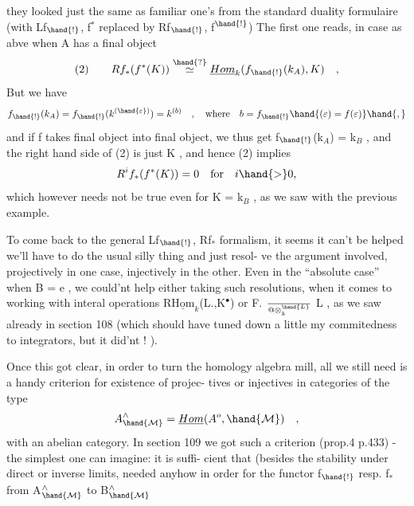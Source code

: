 
they looked just the same as familiar  one's from the standard
duality formulaire (with Lf$_{\hand{!}}$, f$^*$ replaced by Rf$_{\hand{!}}$, f$^{\hand{!}}$) The first
one reads, in case as abve when A has a final object \hand{$\varepsilon$}
\[ \text{(2)} \qquad Rf_*(f^*(K)) \overset{\hand{?}}{\simeq} \underline{Hom}_k(f_{\hand{!}}(k_A),K) \quad , \]
\deleted{\[ Rf_*(f^*(K)) \quad f_*(f^*(K)) \quad \text{i.e.} \quad R^if_*(f^*(K))= 0 \text{ for } i \ 0 \]}
But we have
\[ f_{\hand{!}}(k_A) = f_{\hand{!}}(k^{(\hand{\varepsilon})}) = k^{(b)} \quad , \quad \text{where} \quad b = f_{\hand{!}}\hand{(\varepsilon) = f(\varepsilon)}\hand{,} \]
and if f takes final object into final object, we thus get
f$_{\hand{!}}$(k$_A$) = k$_B$ , and the right hand side of (2) is just K , and hence
(2) implies  
\[ R^if_*(f^*(K)) = 0 \quad \text{for} \quad i \hand{>} 0 , \]
which however needs not be true even for K = k$_B$ , as we saw with the
previous example.

To come back to the general Lf$_{\hand{!}}$, Rf$_*$ formalism, it seems it
can't be helped we'll have to do the usual silly thing and just resol-%
ve the argument involved, projectively in one case, injectively in
the other. Even in the ``absolute case'' when B = e , we could'nt help
either taking such resolutions, when it comes to working with 
interal operations  R$\underline{\mathrm{Hom}}_k$(L.,K$^\bullet$) or F. $\over{@}{\otimes}^{\hand{L}}_k$ L , as we saw already
in section 108 (which should have tuned down a little my commitedness
to integrators, but it did'nt ! ).

Once this got clear, in order to turn the homology algebra
mill, all we still need is a handy criterion for existence of  projec-%
tives or injectives in categories of the type
\[ A^{\wedge}_{\hand{\mathcal{M}}} = \underline{Hom}(A^o, \hand{\mathcal{M}}) \quad , \]
with  an abelian category. In section 109 we got such a criterion
(prop.4 p.433) - the simplest one can imagine: it is  suffi-%
cient that (besides the stability under direct or inverse limits,
needed anyhow in order for the functor f$_{\hand{!}}$ resp. f$_*$ from A$^{\wedge}_{\hand{\mathcal{M}}}$ to B$^{\wedge}_{\hand{\mathcal{M}}}$

